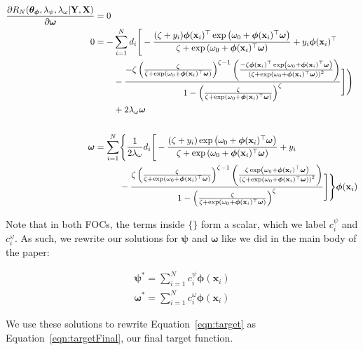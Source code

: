 \documentclass[12pt]{article}
\newcommand{\X}{\mathbf{X}}
\newcommand{\x}{\mathbf{x}}
\newcommand{\Y}{\mathbf{Y}}
\renewcommand{\r}{\right}
\renewcommand{\l}{\left}
\newcommand{\bomega}{\bm{\omega}}
\newcommand{\bpsi}{\bm{\psi}}
\newcommand{\bphi}{\bm{\phi}}
\newcommand{\btheta}{\bm{\theta}}
\begin{document}
\begin{align}
\frac{\partial R_N (\btheta_{\bphi}, \lambda_\psi, \lambda_\omega | \Y, \X)}{\partial \bomega} &= 0 \notag \\
0 &= \begin{aligned}[t]
- & \sum^N_{i=1} d_i \Bigg[ - \frac{(\zeta + y_i) \bphi(\x_i)^\top \exp \l( \omega_0 + \bphi(\x_i)^\top \bomega \r)}{\zeta + \exp \l( \omega_0 + \bphi(\x_i)^\top \bomega \r)} + y_i \bphi(\x_i)^\top \notag \\
& - \frac{-\zeta \l( \frac{\zeta}{\zeta + \exp \l( \omega_0 + \bphi(\x_i)^\top \bomega \r)} \r)^{\zeta - 1} \l( \frac{- \zeta \bphi(\x_i)^\top \exp \l(\omega_0 + \bphi(\x_i)^\top \bomega \r)}{\l( \zeta + \exp \l( \omega_0 + \bphi(\x_i)^\top \bomega \r) \r)^2} \r)}{1 - \l( \frac{\zeta}{\zeta + \exp \l(\omega_0 + \bphi(\x_i)^\top \bomega \r)} \r)^\zeta} \Bigg] \Bigg) \\
&+ 2 \lambda_\omega \bomega 
\end{aligned} \\ \notag \\
\bomega &= \begin{aligned}[t]
\sum^N_{i=1} & \Bigg\{ \frac{1}{2 \lambda_\omega} d_i \Bigg[ - \frac{(\zeta + y_i) \exp \l( \omega_0 + \bphi(\x_i)^\top \bomega \r)}{\zeta + \exp \l( \omega_0 + \bphi(\x_i)^\top \bomega \r)} + y_i  \\
& - \frac{\zeta \l( \frac{\zeta}{\zeta + \exp \l( \omega_0 + \bphi(\x_i)^\top \bomega \r)} \r)^{\zeta - 1} \l( \frac{\zeta \exp \l(\omega_0 + \bphi(\x_i)^\top \bomega \r)}{\l( \zeta + \exp \l( \omega_0 + \bphi(\x_i)^\top \bomega \r) \r)^2} \r)}{1 - \l( \frac{\zeta}{\zeta + \exp \l(\omega_0 + \bphi(\x_i)^\top \bomega \r)} \r)^\zeta} \Bigg] \Bigg\}  \bphi(\x_i)
\end{aligned}
\end{align} 

Note that in both FOCs, the terms inside $\{\}$ form a scalar, which we label $c^\psi_i$ and $c^\omega_i$. As such, we rewrite our solutions for $\bpsi$ and $\bomega$ like we did in the main body of the paper:

\begin{align}
\bpsi^* = \sum^N_{i=1} c^\psi_i \bphi(\x_i) \\
\bomega^* = \sum^N_{i=1} c^\omega_i \bphi(\x_i) 
\end{align} 

We use these solutions to rewrite Equation~\ref{eqn:target} as Equation~\ref{eqn:targetFinal}, our final target function.
\end{document}
